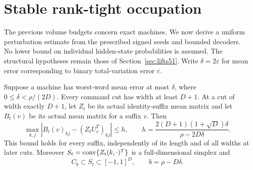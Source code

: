 \section{Stable rank-tight occupation}\label{sec:stable51}
The previous volume budgets concern exact machines. We now derive a
uniform perturbation estimate from the prescribed signed seeds and
bounded decoders. No lower bound on individual hidden-state
probabilities is assumed. The structural hypotheses remain those of
Section~\ref{sec:lifts51}. Write $\delta=2\varepsilon$ for mean
error corresponding to binary total-variation error $\varepsilon$.

\begin{lemma}
\label{lem:anchor51}
Suppose a machine has worst-word mean error at most $\delta$, where
$0\le\delta<\rho/(2D)$. Every command cut has width at least $D+1$.
At a cut of width exactly $D+1$, let $Z_t$ be its actual identity-suffix
mean matrix and let $B_t(v)$ be its actual mean matrix for a suffix
$v$. Then
\begin{equation}\label{eq:row-stability51}
 \max_{k,j}|B_t(v)_{kj}-(Z_tU_v^T)_{kj}|
 \le h,\qquad
 h=\frac{2(D+1)(1+\sqrt D)\delta}{\rho-2D\delta}.
\end{equation}
This bound holds for every suffix, independently of its length and of
all widths at later cuts. Moreover $S_t=\operatorname{conv}\{Z_t(k,\cdot)^T\}$
is a full-dimensional simplex and
\begin{equation}\label{eq:inner-stability51}
 C_b\subset S_t\subset[-1,1]^D,\qquad b=\rho-D\delta.
\end{equation}
\end{lemma}
